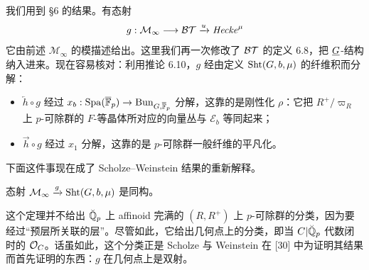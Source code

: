 我们用到 §6 的结果。有态射
\[
g:\mathcal{M}_\infty\longrightarrow\mathcal{BT}\xrightarrow{u}\mathit{Hecke}^{\mu}
\]
它由前述 $\mathcal{M}_\infty$ 的模描述给出。这里我们再一次修改了 $\mathcal{BT}$ 的定义 6.8，把 $\underline{G}$-结构纳入进来。现在容易核对：利用推论 6.10，$g$ 经由定义 $\operatorname{Sht}(G,b,\mu)$ 的纤维积而分解：
\begin{itemize}
\item $\overleftarrow{h}\circ g$ 经过 $x_b:\mathrm{Spa}(\overline{\mathbb{F}}_p)\to\mathrm{Bun}_{G,\overline{\mathbb{F}}_p}$ 分解，这靠的是刚性化 $\rho$：它把 $R^+/\varpi_R$ 上 $p$-可除群的 $F$-等晶体所对应的向量丛与 $\mathscr{E}_b$ 等同起来；
\item $\overrightarrow{h}\circ g$ 经过 $x_1$ 分解，这靠的是 $p$-可除群一般纤维的平凡化。
\end{itemize}
下面这件事现在成了 Scholze--Weinstein 结果的重新解释。

\begin{theorem}\label{thm:8.7}
态射 $\mathcal{M}_\infty\xrightarrow{g}\operatorname{Sht}(G,b,\mu)$ 是同构。
\end{theorem}

\begin{remark}\label{rem:8.8}
这个定理并不给出 $\breve{\mathbb{Q}}_p$ 上 affinoid 完满的 $(R,R^+)$ 上 $p$-可除群的分类，因为要经过“预层所关联的层”。尽管如此，它给出几何点上的分类，即当 $C|\breve{\mathbb{Q}}_p$ 代数闭时的 $\mathcal{O}_C$。话虽如此，这个分类正是 Scholze 与 Weinstein 在 [30] 中为证明其结果而首先证明的东西：$g$ 在几何点上是双射。
\end{remark}

